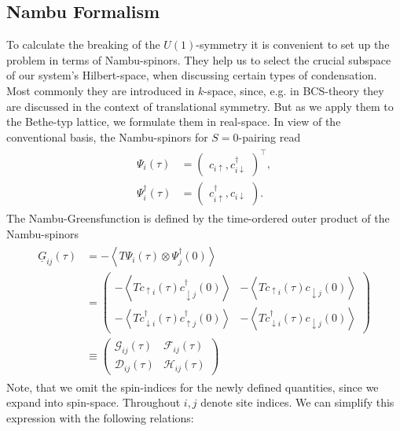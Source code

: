 \documentclass[aps,prb,twocolumn,groupedaddress,amsmath,amssymb]{revtex4-1}
\newcommand{\up}{\uparrow}
\newcommand{\dn}{\downarrow}
\newcommand{\expectv}[1]{\left< #1 \right>}
\newcommand{\nambu}[1]{\mathcal{#1}}
\newcommand{\Nambu}[1]{\underline{#1}}
\begin{document}
\subsection{Nambu Formalism}
To calculate the breaking of the $U(1)$-symmetry it is convenient to set up the problem in terms of Nambu-spinors. They help us to select the crucial subspace of our system's Hilbert-space, when discussing certain types of condensation. Most commonly they are introduced in $k$-space, since, e.g. in BCS-theory they are discussed in the context of translational symmetry\cite{AlexanderAltland2010,HenrikBruus2004}. But as we apply them to the Bethe-typ lattice, we formulate them in real-space. In view of the conventional basis, the Nambu-spinors for $S=0$-pairing read
\begin{align}
  \label{eq:nambuspinors}
  \begin{split}
    \Psi_i(\tau) &= \begin{pmatrix}c_{i\up},c_{i\dn}^{\dagger} \end{pmatrix}^\intercal,\\
    \Psi^{\dagger}_i(\tau) &= \begin{pmatrix}c^\dagger_{i\up},c_{i\dn} \end{pmatrix}.
  \end{split}
\end{align}
The Nambu-Greensfunction is defined by the time-ordered outer product of the Nambu-spinors
\begin{align}
  \label{eq:nambugf}
  \begin{split}
    \Nambu{G}_{ij}(\tau)&=-\expectv{T\Psi_i(\tau)\otimes\Psi^\dagger_j(0)}\\
    &=\begin{pmatrix}-\expectv{Tc_{\up i}(\tau)c^\dagger_{\dn j}(0)}&-\expectv{Tc_{\up i}(\tau)c_{\dn j}(0)}\\-\expectv{Tc^\dagger_{\dn i}(\tau)c^\dagger_{\up j}(0)}&-\expectv{Tc^\dagger_{\dn i}(\tau)c_{\dn j}(0)}\end{pmatrix}\\
    &\equiv\begin{pmatrix}\nambu{G}_{ij}(\tau)&\nambu{F}_{ij}(\tau)\\\nambu{D}_{ij}(\tau)&\nambu{H}_{ij}(\tau)\end{pmatrix}
  \end{split}
 \end{align}
Note, that we omit the spin-indices for the newly defined quantities, since we expand into spin-space. Throughout $i,j$ denote site indices. We can simplify this expression with the following relations:
\end{document}
